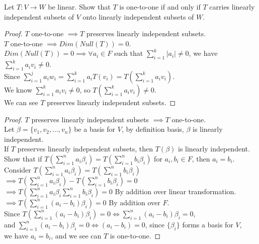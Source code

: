 \documentclass[12pt]{article}
\newenvironment{exercise}[2][Exercise]{\begin{trivlist}
\item[\hskip \labelsep{\bfseries #1}\hskip \labelsep{\bfseries #2.}]}{\end{trivlist}}
\begin{document}
\begin{exercise}{2.1.14a} Let $T: V \rightarrow W$ be linear. 
    Show that $T$ is one-to-one if and only if $T$ carries linearly independent subsets of $V$ onto linearly independent subsets of $W$.

    \begin{proof} $T$ one-to-one $\implies T$ preserves linearly independent subsets. \\

        \noindent $T$ one-to-one $\implies Dim(Null(T)) = 0$. \\
        $Dim(Null(T)) = 0 \implies \forall a_i \in F$ such that $\sum_{i=1}^{k} |a_i| \neq 0$, we have $\sum_{i=1}^{k} a_i v_i \neq 0$. \\
        Since $\sum_{i=1}^{j} a_i w_i = \sum_{i=1}^{k} a_i T(v_i) = T(\sum_{i=1}^{k} a_i v_i)$. \\
        We know $\sum_{i=1}^{k} a_i v_i \neq 0$, so $T(\sum_{i=1}^{k} a_i v_i) \neq 0$. \\
        We can see $T$ preserves linearly independent subsets.
        
    \end{proof}

    \begin{proof} $T$ preserves linearly independent subsets $\implies T$ one-to-one. \\

        \noindent Let $\beta = \{v_1, v_2, \dots, v_n\}$ be a basis for $V$, by definition basis, $\beta$ is linearly independent. \\
        If $T$ preserves linearly independent subsets, then $T(\beta)$ is linearly independent. \\
        Show that if $T(\sum_{i=1}^{n} a_i \beta_i) = T(\sum_{i=1}^{n} b_i \beta_i)$ for $a_i, b_i \in F$, then $a_i = b_i$. \\
        Consider $T(\sum_{i=1}^{n} a_i \beta_i) = T(\sum_{i=1}^{n} b_i \beta_i)$ \\
        $\implies T(\sum_{i=1}^{n} a_i \beta_i) - T(\sum_{i=1}^{n} b_i \beta_i) = 0$ \\
        $\implies T(\sum_{i=1}^{n} a_i \beta_i \sum_{i=1}^{n} b_i \beta_i) = 0$ By addition over linear transformation. \\
        $\implies T(\sum_{i=1}^{n} (a_i - b_i) \beta_i) = 0$ By addition over $F$. \\
        Since $T(\sum_{i=1}^{n} (a_i - b_i) \beta_i) = 0 \iff \sum_{i=1}^{n} (a_i - b_i) \beta_i = 0$, \\
        and $\sum_{i=1}^{n} (a_i - b_i) \beta_i = 0 \iff (a_i - b_i) = 0$, since $\{\beta_i\}$ forms a basis for $V$, \\
        we have $a_i = b_i$, and we see can $T$ is one-to-one.


\end{proof}
\end{exercise}
\end{document}
